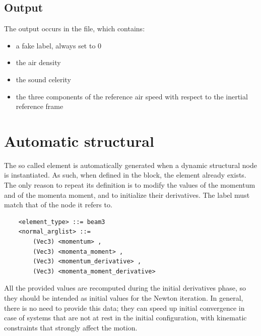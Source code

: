 \subsection{Output}
The output occurs in the  file, which contains:
\begin{itemize}
\item a fake label, always set to 0
\item the air density
\item the sound celerity
\item the three components of the reference air speed
with respect to the inertial reference frame
\end{itemize}



\section{Automatic structural}
The so called  element is automatically generated
when a dynamic structural node is instantiated.
As such, when defined in the  block,
the element already exists.
The only reason to repeat its definition is to modify the values
of the momentum and of the momenta moment, and to initialize
their derivatives.
The label must match that of the node it refers to.
\begin{verbatim}
    <element_type> ::= beam3
    <normal_arglist> ::=
        (Vec3) <momentum> ,
        (Vec3) <momenta_moment> ,
        (Vec3) <momentum_derivative> ,
        (Vec3) <momenta_moment_derivative>
\end{verbatim}
All the provided values are recomputed during the initial derivatives phase,
so they should be intended as initial values for the Newton iteration.
In general, there is no need to provide this data; they can speed up
initial convergence in case of systems that are not at rest in the initial
configuration, with kinematic constraints that strongly affect
the motion.

